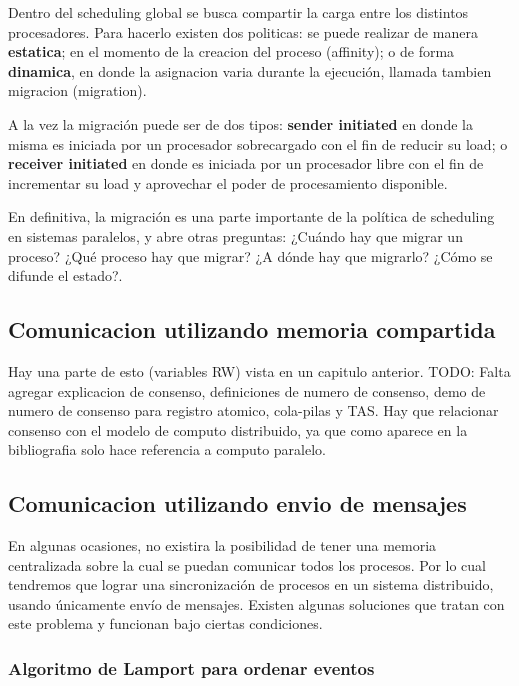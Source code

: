 \documentclass{article}
\begin{document}
Dentro del scheduling global se busca compartir la carga entre los distintos procesadores. Para hacerlo existen dos politicas: se puede realizar de manera \textbf{estatica}; en el momento de la creacion del proceso (affinity); o de forma \textbf{dinamica}, en donde la asignacion varia durante la ejecución, llamada tambien migracion (migration).

A la vez la migración puede ser de dos tipos: \textbf{sender initiated} en donde la misma es iniciada por un procesador sobrecargado con el fin de reducir su load; o \textbf{receiver initiated} en donde es iniciada por un procesador libre con el fin de incrementar su load y aprovechar el poder de procesamiento disponible.

En definitiva, la migración es una parte importante de la política de scheduling en sistemas paralelos, y abre otras preguntas: ¿Cuándo hay que migrar un proceso? ¿Qué proceso hay que migrar? ¿A dónde hay que migrarlo? ¿Cómo se difunde el estado?.

\subsection{Comunicacion utilizando memoria compartida}

Hay una parte de esto (variables RW) vista en un capitulo anterior. TODO: Falta agregar explicacion de consenso, definiciones de numero de consenso, demo de numero de consenso para registro atomico, cola-pilas y TAS. Hay que relacionar consenso con el modelo de computo distribuido, ya que como aparece en la bibliografia solo hace referencia a computo paralelo.

\subsection{Comunicacion utilizando envio de mensajes}
En algunas ocasiones, no existira la posibilidad de tener una memoria centralizada sobre la cual se puedan comunicar todos los procesos. Por lo cual tendremos que lograr una sincronización de procesos en un sistema distribuido, usando únicamente envío de mensajes. Existen algunas soluciones que tratan con este problema y funcionan bajo ciertas condiciones.

\subsubsection{Algoritmo de Lamport para ordenar eventos}
\end{document}
